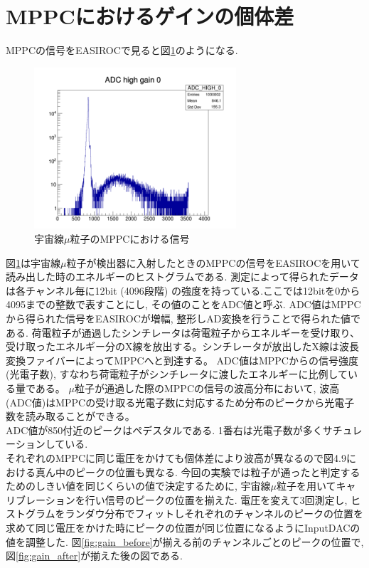 \section{MPPCにおけるゲインの個体差}
MPPCの信号をEASIROCで見ると図\ref{fig:mu_mppc}のようになる.
\begin{figure}[H]
    \centering
    \includegraphics[height=6cm]{img/mppc_gain.jpg}
    \caption{宇宙線$\mu$粒子のMPPCにおける信号}
    \label{fig:mu_mppc}
\end{figure}
図\ref{fig:mu_mppc}は宇宙線$\mu$粒子が検出器に入射したときのMPPCの信号をEASIROCを用いて読み出した時のエネルギーのヒストグラムである.
測定によって得られたデータは各チャンネル毎に12bit (4096段階) の強度を持っている.ここでは12bitを0から4095までの整数で表すことにし, その値のことをADC値と呼ぶ.
ADC値はMPPCから得られた信号をEASIROCが増幅, 整形しAD変換を行うことで得られた値である.
荷電粒子が通過したシンチレータは荷電粒子からエネルギーを受け取り、受け取ったエネルギー分のX線を放出する。シンチレータが放出したX線は波長変換ファイバーによってMPPCへと到達する。
ADC値はMPPCからの信号強度(光電子数), すなわち荷電粒子がシンチレータに渡したエネルギーに比例している量である。
$\mu$粒子が通過した際のMPPCの信号の波高分布において, 波高(ADC値)はMPPCの受け取る光電子数に対応するため分布のピークから光電子数を読み取ることができる。
\\
ADC値が850付近のピークはペデスタルである.
1番右は光電子数が多くサチュレーションしている.\\
それぞれのMPPCに同じ電圧をかけても個体差により波高が異なるので図4.9における真ん中のピークの位置も異なる.
今回の実験では粒子が通ったと判定するためのしきい値を同じくらいの値で決定するために, 宇宙線$\mu$粒子を用いてキャリブレーションを行い信号のピークの位置を揃えた.
電圧を変えて3回測定し, ヒストグラムをランダウ分布でフィットしそれぞれのチャンネルのピークの位置を求めて同じ電圧をかけた時にピークの位置が同じ位置になるようにInputDACの値を調整した.
図\ref{fig:gain_before}が揃える前のチャンネルごとのピークの位置で, 図\ref{fig:gain_after}が揃えた後の図である.
